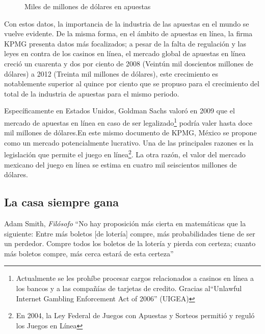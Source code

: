 \begin{figure}[!htb]\centering
   \begin {minipage}{0.85\textwidth}
     \caption{Miles de millones de dólares en apuestas}\label{Fig:gasto-apuestas}
   \end{minipage}
\end{figure}

Con estos datos, la importancia de la industria de las apuestas en el mundo se vuelve evidente. De la misma forma, en el ámbito de apuestas en línea, la firma KPMG\cite{kpmgOnlineGaming} presenta datos más focalizados; a pesar de la falta de regulación y las leyes en contra de los casinos en línea, el mercado global de apuestas en línea creció un cuarenta y dos por ciento de 2008 (Veintún mil doscientos millones de dólares) a 2012 (Treinta mil millones de dólares), este crecimiento es notablemente superior al quince por ciento que se propuso para el crecimiento del total de la industria de apuestas para el mismo periodo.

Específicamente en Estados Unidos, Goldman Sachs valoró en 2009 que el mercado de apuestas en línea en caso de ser legalizado\footnote{Actualmente se les prohíbe procesar cargos relacionados a casinos en línea a los bancos y a las compañías de tarjetas de credito. Gracias al``Unlawful Internet Gambling Enforcement Act of 2006'' (UIGEA)} podría valer hasta doce mil millones de dólares\cite{goldmanParty}.En este mismo documento de KPMG\cite{kpmgOnlineGaming}, México se propone como un mercado potencialmente lucrativo. Una de las principales razones es la legislación que permite el juego en línea\footnote{En 2004, la Ley Federal de Juegos con Apuestas y Sorteos permitió y reguló los Juegos en Línea}. La otra razón, el valor del mercado mexicano del juego en línea se estima en cuatro mil seiscientos millones de dólares\cite{yogonet}.

\subsection{La casa siempre gana}

\begin{chapquote}{Adam Smith, \textit{Filósofo}}
	``No hay proposición más cierta en matemáticas que la siguiente: Entre más boletos [de lotería] compre, más probabilidades tiene de ser un perdedor. Compre todos los boletos de la lotería y pierda con certeza; cuanto más boletos compre, más cerca estará de esta certeza''
\end{chapquote}

